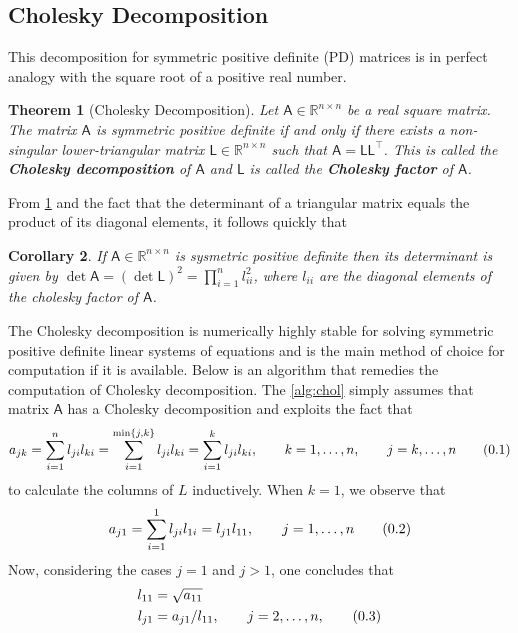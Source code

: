 \documentclass[10pt]{article}
\newtheorem{thm}{Theorem}[section]
\newtheorem{cor}[thm]{Corollary}
\theoremstyle{definition}
\theoremstyle{definition}
\theoremstyle{remark}
\newcommand\eqnum{\addtocounter{equation}{1}\tag{\arabic{section}.\arabic{equation}}}
\begin{document}
\subsection{Cholesky Decomposition}
This decomposition for symmetric positive definite (PD) matrices is in perfect analogy with the square root of a positive real number.
\begin{thm}[Cholesky Decomposition]\label{thm:chol}
Let $\mathsf{A} \in \mathbb{R}^{n\times n}$ be a real square matrix. The matrix $\mathsf{A}$ is symmetric positive definite if and only if there exists a non-singular lower-triangular matrix $\mathsf{L}\in\mathbb{R}^{n \times n}$ such that $\mathsf{A}=\mathsf{L} \mathsf{L}^{\top}$. This is called the \textbf{Cholesky decomposition} of $\mathsf{A}$ and $\mathsf{L}$ is called the \textbf{Cholesky factor} of $\mathsf{A}$.
\end{thm}
From \cref{thm:chol} and the fact that the determinant of a triangular matrix equals the product of its diagonal elements, it follows quickly that
\begin{cor}
If $\mathsf{A} \in \mathbb{R}^{n\times n}$  is sysmetric positive definite then its determinant is given by $\det\mathsf{A} = (\det\mathsf{L})^2 = \prod_{i=1}^{n}l_{ii}^2$, where $l_{ii}$ are the diagonal elements of the cholesky factor of $\mathsf{A}$.
\end{cor}
The Cholesky decomposition is numerically highly stable for solving symmetric positive definite linear systems of equations and is the main method of choice for computation if it is available. Below is an algorithm that remedies the computation of Cholesky decomposition. The \cref{alg:chol} simply assumes that matrix $\mathsf{A}$ has a Cholesky decomposition and exploits the fact that
\begin{equation*}
a_{jk}  = \sum_{i=1}^{n}l_{ji}l_{ki} = 
\sum_{i=1}^{\min\{j, k\}}l_{ji}l_{ki} = 
\sum_{i=1}^{k}l_{ji}l_{ki}, 
\qquad k=1,\dots, n, \qquad j = k,\dots, n
\eqnum
\label{eq:chol}
\end{equation*}
to calculate the columns of $L$ inductively. When $k=1$, we observe that 
\begin{equation*}
a_{j1} = \sum_{i=1}^{1}l_{ji}l_{1i} = l_{j1}l_{11}, \qquad j = 1,\dots, n
\eqnum
\end{equation*}
Now, considering the cases $j=1$ and $j>1$, one concludes that
\begin{align*}
l_{11} &= \sqrt{a_{11} } \\
l_{j1} &= a_{j1}/l_{11}, \qquad j=2,\dots,n,
\eqnum
\end{align*}
\end{document}
